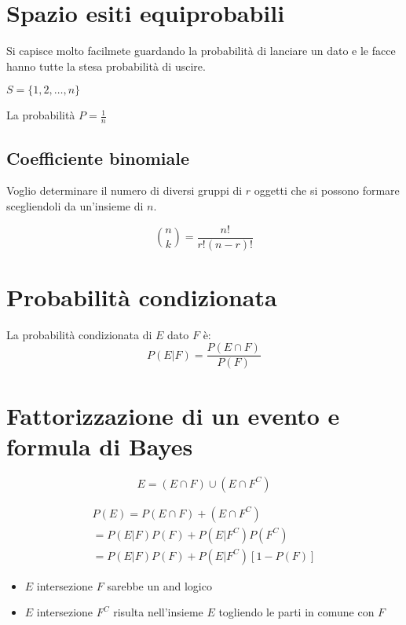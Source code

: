 \section{Spazio esiti equiprobabili}

Si capisce molto facilmete guardando la probabilità di lanciare un dato e le facce hanno tutte la stesa probabilità
di uscire. 

$S = \{1, 2, \dots, n\}$

La probabilità $P = \displaystyle\frac{1}{n}$

\subsection{Coefficiente binomiale}

Voglio determinare il numero di diversi gruppi di $r$ oggetti che si possono formare scegliendoli da 
un'insieme di $n$. 

\begin{equation}
    \binom{n}{k} = \displaystyle\frac{n!}{r!(n-r)!}
\end{equation}


\section{Probabilità condizionata}

La probabilità condizionata di $E$ dato $F$ è:
\begin{equation}
    P(E|F) = \displaystyle\frac{P(E\cap F)}{P(F)} 
\end{equation}


\section{Fattorizzazione di un evento e formula di Bayes}


\begin{equation}
    E = (E \cap F) \cup (E \cap F^C)
\end{equation}

\begin{equation}
    \begin{split}    
    P(E) = P(E \cap F) + (E \cap F^C) \\ 
        = P(E|F)P(F) + P(E|F^C)P(F^C) \\
        = P(E|F)P(F) + P(E|F^C)[1 - P(F)]
    \end{split}
\end{equation}

\begin{itemize}
    \item $E$ intersezione $F$ sarebbe un and logico 
    \item $E$ intersezione $F^C$ risulta nell'insieme $E$ togliendo le parti in comune con $F$
\end{itemize}




